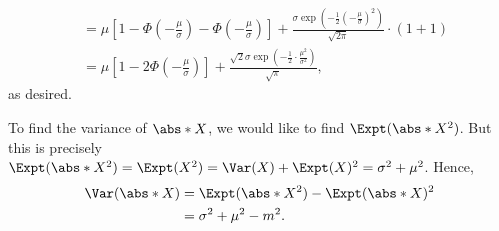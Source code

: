 \begin{enumerate}
\begin{align*}
                & = \mu \left[1 - \Phi\left(- \frac{\mu}{\sigma}\right) - \Phi\left(- \frac{\mu}{\sigma}\right)\right] + \frac{\sigma \exp\left(-\frac{1}{2} \left(- \frac{\mu}{\sigma}\right)^2\right)}{\sqrt{2\pi}} \cdot (1 + 1)                                                                                                                                                                                                                                       \\
                & = \mu \left[1 - 2 \Phi \left(-\frac{\mu}{\sigma}\right)\right] + \frac{\sqrt{2}\sigma \exp\left(-\frac{1}{2} \cdot \frac{\mu^2}{\sigma^2}\right)}{\sqrt{\pi}},
          \end{align*}
          as desired.

          To find the variance of \(\abs*{X}\), we would like to find \(\Expt(\abs*{X}^2)\). But this is precisely \(\Expt(\abs*{X}^2) = \Expt(X^2) = \Var(X) + \Expt(X)^2 = \sigma^2 + \mu^2\). Hence,
          \begin{align*}
              \Var(\abs*{X}) & = \Expt(\abs*{X}^2) - \Expt(\abs*{X})^2 \\
                             & = \sigma^2 + \mu^2 - m^2.
          \end{align*}
\end{enumerate}